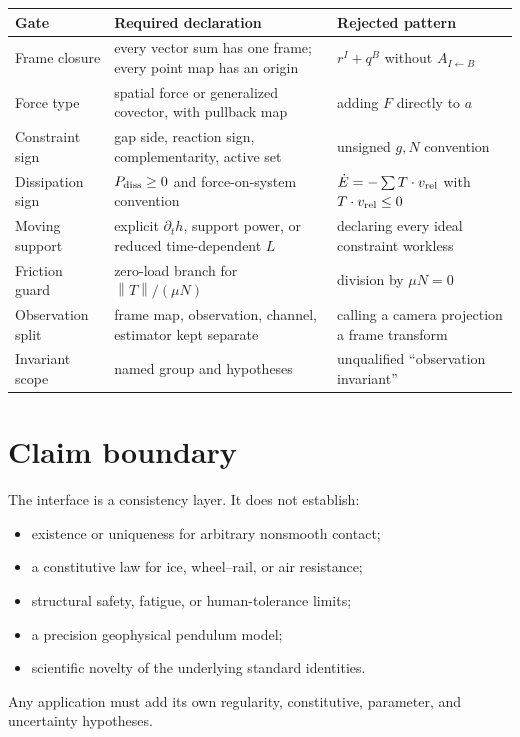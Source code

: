 \documentclass[11pt,a4paper]{article}
\theoremstyle{definition}
\theoremstyle{plain}
\theoremstyle{remark}
\newcommand{\norm}[1]{\left\lVert #1\right\rVert}
\begin{document}
\begin{longtable}{L{31mm}L{46mm}L{65mm}}
\toprule
Gate & Required declaration & Rejected pattern \\
\midrule
\endhead
Frame closure & every vector sum has one frame; every point map has an
origin & \(r^I+q^B\) without \(A_{I\leftarrow B}\) \\
Force type & spatial force or generalized covector, with pullback map
& adding \(F\) directly to \(a\) \\
Constraint sign & gap side, reaction sign, complementarity, active set
& unsigned \(g,N\) convention \\
Dissipation sign & \(P_{\rm diss}\ge0\) and force-on-system convention
& \(\dot E=-\sum T\cdot v_{\rm rel}\) with \(T\cdot v_{\rm rel}\le0\) \\
Moving support & explicit \(\partial_t h\), support power, or reduced
time-dependent \(L\) & declaring every ideal constraint workless \\
Friction guard & zero-load branch for \(\norm T/(\mu N)\) & division by
\(\mu N=0\) \\
Observation split & frame map, observation, channel, estimator kept
separate & calling a camera projection a frame transform \\
Invariant scope & named group and hypotheses & unqualified
``observation invariant'' \\
\bottomrule
\end{longtable}

\section{Claim boundary}

The interface is a consistency layer. It does not establish:
\begin{itemize}
  \item existence or uniqueness for arbitrary nonsmooth contact;
  \item a constitutive law for ice, wheel--rail, or air resistance;
  \item structural safety, fatigue, or human-tolerance limits;
  \item a precision geophysical pendulum model;
  \item scientific novelty of the underlying standard identities.
\end{itemize}
Any application must add its own regularity, constitutive, parameter,
and uncertainty hypotheses.
\end{document}
